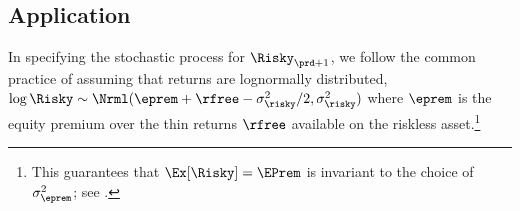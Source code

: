 \documentclass[\econtexRoot/SolvingMicroDSOPs]{subfiles}
\begin{document}


\subsection{Application}\label{subsec:MCApplication}


In specifying the stochastic process for $\Risky_{\prd+1}$, we follow the common practice of assuming that returns are lognormally distributed, $\log \Risky \sim \Nrml(\eprem+\rfree-\sigma^{2}_{\risky}/2,\sigma^{2}_{\risky})$ where $\eprem$ is the equity premium over the thin returns $\rfree$ available on the riskless asset.\footnote{This guarantees that $\Ex[\Risky] = \EPrem$ is invariant to the choice of $\sigma^{2}_{\eprem}$; see .}
\end{document}
